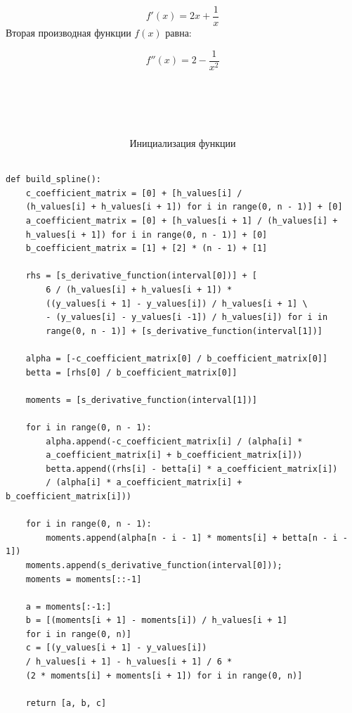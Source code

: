 \documentclass{article}
\begin{document}
\begin{equation}
f'(x) = 2x + \frac{1}{x}
\end{equation}
 Вторая производная функции \( f(x) \) равна:

\begin{equation}
f''(x) = 2 - \frac{1}{x^2}
\end{equation} \\ \\ \\ \\ \\ 


$$\textbf{Инициализация функции}$$
\begin{lstlisting}

def build_spline():
    c_coefficient_matrix = [0] + [h_values[i] / 
    (h_values[i] + h_values[i + 1]) for i in range(0, n - 1)] + [0]
    a_coefficient_matrix = [0] + [h_values[i + 1] / (h_values[i] +
    h_values[i + 1]) for i in range(0, n - 1)] + [0]
    b_coefficient_matrix = [1] + [2] * (n - 1) + [1]

    rhs = [s_derivative_function(interval[0])] + [
        6 / (h_values[i] + h_values[i + 1]) * 
        ((y_values[i + 1] - y_values[i]) / h_values[i + 1] \
        - (y_values[i] - y_values[i -1]) / h_values[i]) for i in
        range(0, n - 1)] + [s_derivative_function(interval[1])]

    alpha = [-c_coefficient_matrix[0] / b_coefficient_matrix[0]]
    betta = [rhs[0] / b_coefficient_matrix[0]]

    moments = [s_derivative_function(interval[1])]

    for i in range(0, n - 1):
        alpha.append(-c_coefficient_matrix[i] / (alpha[i] *
        a_coefficient_matrix[i] + b_coefficient_matrix[i]))
        betta.append((rhs[i] - betta[i] * a_coefficient_matrix[i])
        / (alpha[i] * a_coefficient_matrix[i] + b_coefficient_matrix[i]))

    for i in range(0, n - 1):
        moments.append(alpha[n - i - 1] * moments[i] + betta[n - i - 1])
    moments.append(s_derivative_function(interval[0]));
    moments = moments[::-1]

    a = moments[:-1:]
    b = [(moments[i + 1] - moments[i]) / h_values[i + 1]
    for i in range(0, n)]
    c = [(y_values[i + 1] - y_values[i]) 
    / h_values[i + 1] - h_values[i + 1] / 6 * 
    (2 * moments[i] + moments[i + 1]) for i in range(0, n)]

    return [a, b, c]

\end{lstlisting}
\end{document}
